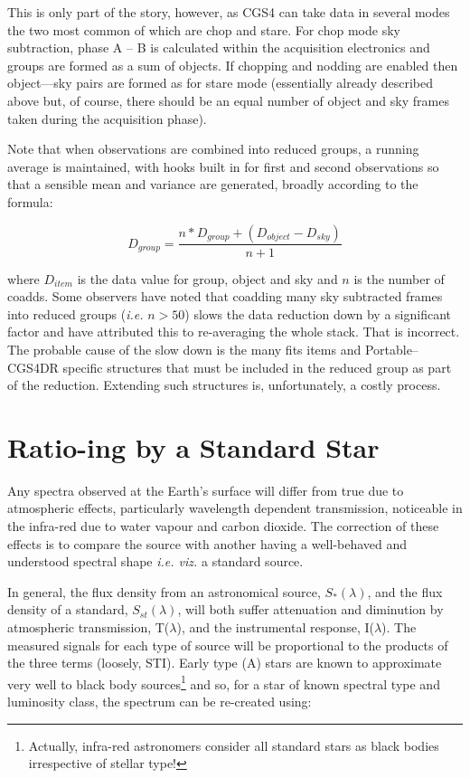 \documentclass[a4paper]{book}
\renewcommand{\_}{{\tt\char'137}}
\begin{document}
This is only part of the story, however, as CGS4 can take data in several
modes the two most common of which are {\sc chop} and {\sc stare}.  For
{\sc chop} mode sky subtraction, phase A -- B is calculated within the
acquisition electronics and groups are formed as a sum of objects. If
chopping and nodding are enabled then {\sc object---sky} pairs are formed
as for {\sc stare} mode (essentially already described above but, of
course, there should be an equal number of {\sc object} and {\sc sky}
frames taken during the acquisition phase).

Note that when observations are combined into reduced groups, a running
average is maintained, with hooks built in for first and second
observations so that a sensible mean and variance are generated, broadly
according to the formula:

\begin{equation}
D_{group} = \frac{n*D_{group} + (D_{object} - D_{sky})}{n+1} \label{equation_4}
\end{equation}

where $D_{item}$ is the data value for group, object and sky and $n$ is
the number of coadds. Some observers have noted that coadding many sky
subtracted frames into reduced groups ({\em i.e.} $ n > 50 $) slows the
data reduction down by a significant factor and have attributed this to
re-averaging the whole stack. That is incorrect. The probable cause of the
slow down is the many {\sc fits} items and Portable--CGS4DR specific
structures that must be included in the reduced group as part of the
reduction. Extending such structures is, unfortunately, a costly process.

\section{Ratio-ing by a Standard Star}
Any spectra observed at the Earth's surface will differ from true due to
atmospheric effects, particularly wavelength dependent transmission,
noticeable in the infra-red due to water vapour and carbon dioxide.
The correction of these effects is to compare the source with another
having a well-behaved and understood spectral shape {\em i.e. viz.} a
standard source.

In general, the flux density from an astronomical source,
$S_{*}(\lambda)$, and the flux density of a standard, $S_{st}(\lambda)$,
will both suffer attenuation and diminution by atmospheric transmission,
T($\lambda$), and the instrumental response, I($\lambda$). The measured
signals for each type of source will be proportional to the products of
the three terms (loosely, STI). Early type (A) stars are known to
approximate very well to black body sources\footnote[3]{Actually,
infra-red astronomers consider all standard stars as black bodies
irrespective of stellar type!} and so, for a star of known spectral type
and luminosity class, the spectrum can be re-created using:
\end{document}
